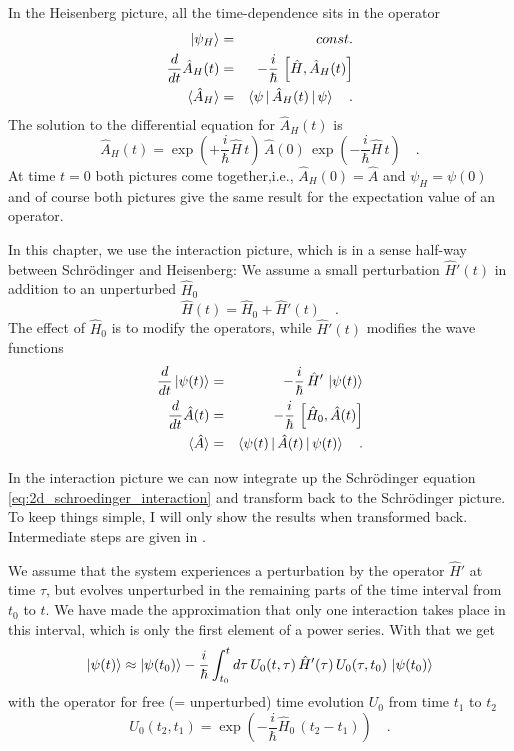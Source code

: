 In the Heisenberg picture, all the time-dependence sits in the operator
\begin{eqnarray}
 \ket{\psi_H} &=& const. \\
 \frac{d}{dt} \hat{A}_H(t) &=& - \frac{i}{\hbar} \, \left[ \hat{H} , \hat{A}_H(t) \right] \\
 \braket{\hat{A}_H} &=& \braket{\psi \, | \,\hat{A}_H (t) \, |\, \psi }  \quad .
\end{eqnarray}
The solution to the differential equation for  $\hat{A}_H(t)$ is
\begin{equation}
 \hat{A}_H(t) = \exp \left(+ \frac{i}{\hbar} \hat{H} \, t \right) \, \hat{A}(0) \, \exp \left(- \frac{i}{\hbar} \hat{H} \, t \right) \quad .
\end{equation}
At time $t=0$ both pictures come together,i.e., $\hat{A}_H(0) = \hat{A}$ and $\psi_H = \psi(0)$ and of course both pictures give the same result  for the expectation value  of an operator.

In  this chapter, we use the  interaction picture, which is in a sense half-way between Schrödinger and Heisenberg: We assume a small perturbation $\hat{H}'(t)$ in addition to an unperturbed $\hat{H}_0$
\begin{equation}
 \hat{H}(t) = \hat{H}_0 + \hat{H}'(t) \quad . \label{eq:2d_hamilton_perturbation}
\end{equation}
The effect of  $\hat{H}_0$ is to modify the operators, while $\hat{H}'(t)$ modifies the wave functions
\begin{eqnarray}
  \frac{d}{dt} \ket{\psi(t)} &=& - \frac{i}{\hbar} \, \hat{H}' \, \ket{\psi(t)}  \label{eq:2d_schroedinger_interaction}\\
 \frac{d}{dt} \hat{A}(t) &=& - \frac{i}{\hbar} \, \left[ \hat{H}_0 , \hat{A}(t) \right] \\
 \braket{\hat{A}} &=& \braket{\psi(t) \, | \,\hat{A} (t) \, |\, \psi(t) }  \quad .
\end{eqnarray}


In the interaction picture we can now integrate up the Schrödinger equation \ref{eq:2d_schroedinger_interaction} and transform back to the Schrödinger picture. To keep things simple, I will only show the results when transformed back. Intermediate steps are given in \cite{Hamm-dummies}.


We assume  that the system experiences a perturbation by the operator $\hat{H}'$ at time $\tau$, but evolves unperturbed in the remaining parts of the time interval from $t_0$ to $t$.  We have made the approximation that only one interaction takes place in this interval, which is only the first element of a power series. With that we get
\begin{equation}
\ket{\psi(t)}  
  \approx  \ket{\psi(t_0)} - \frac{i}{\hbar} \int_{t_0}^t d \tau \,  U_0( t , \tau) \,\hat{H}'(\tau) \,  U_0 (\tau , t_0) \, \ket{\psi(t_0)}  \label{eq:2d_time_evol}
\end{equation}
with the operator for free (= unperturbed) time evolution $U_0$ from time $t_1$ to $t_2$
\begin{equation}
 U_0(t_2, t_1) = \exp \left(- \frac{i}{\hbar} \hat{H}_0 \, ( t_2- t_1) \right) \quad .
\end{equation}




